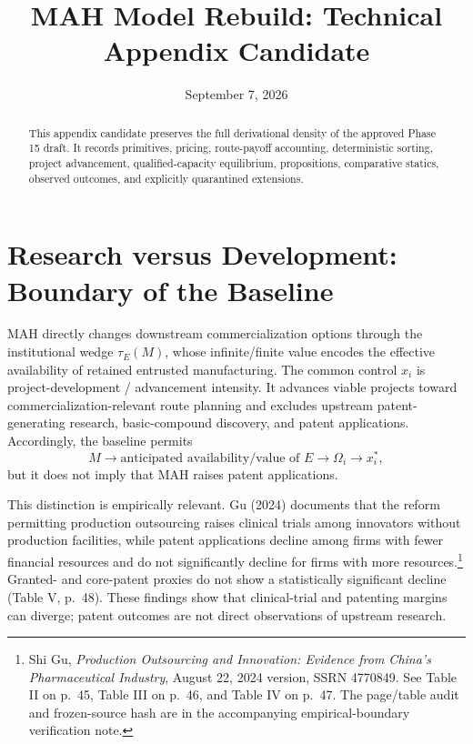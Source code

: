 \documentclass[11pt]{article}
\title{MAH Model Rebuild: Technical Appendix Candidate}
\author{}
\date{September 7, 2026}
\begin{document}
\maketitle

\begin{abstract}
This appendix candidate preserves the full derivational density of the
approved Phase 15 draft. It records primitives, pricing, route-payoff
accounting, deterministic sorting, project advancement, qualified-capacity
equilibrium, propositions, comparative statics, observed outcomes, and
explicitly quarantined extensions.
\end{abstract}

\tableofcontents












\section{Research versus Development: Boundary of the Baseline}
\label{sec:p16a-research-development-boundary}

MAH directly changes downstream commercialization options through the
institutional wedge \(\tau_E(M)\), whose infinite/finite value encodes the
effective availability of retained entrusted manufacturing. The common control \(x_i\) is project-development / advancement intensity. It advances viable projects
toward commercialization-relevant route planning and excludes upstream patent-generating research, basic-compound
discovery, and patent applications. Accordingly, the baseline permits
\[
  M
  \longrightarrow
  \text{anticipated availability/value of }E
  \longrightarrow
  \Omega_i
  \longrightarrow
  x_i^*,
\]
but it does not imply that MAH raises patent applications.

This distinction is empirically relevant. Gu (2024) documents that the
reform permitting production outsourcing raises clinical trials among
innovators without production facilities, while patent applications decline
among firms with fewer financial resources and do not significantly decline
for firms with more resources.\footnote{Shi Gu,
\textit{Production Outsourcing and Innovation: Evidence from China's
Pharmaceutical Industry}, August 22, 2024 version, SSRN 4770849. See
Table II on p.~45, Table III on p.~46, and Table IV on p.~47. The
page/table audit and frozen-source hash are in
the accompanying empirical-boundary verification note.}
Granted- and core-patent proxies do not show a statistically significant
decline (Table V, p.~48). These findings show that clinical-trial and patenting
margins can diverge; patent outcomes are not direct observations of upstream
research.
\end{document}
